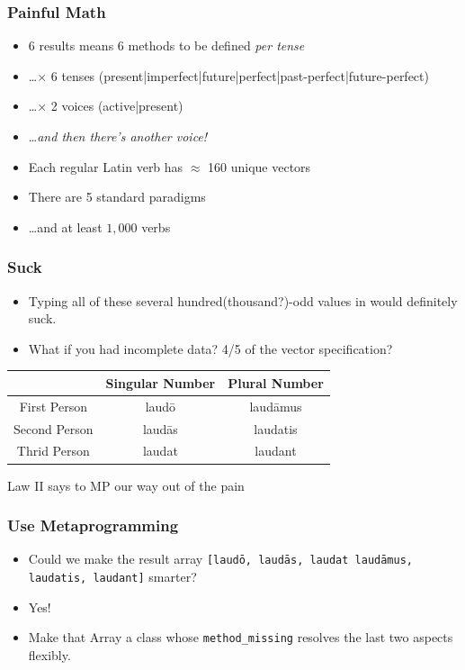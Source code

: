 \documentclass[slidestop,compress,mathserif]{beamer}
\begin{document}


\begin{frame}
	\frametitle{Painful Math}
	\begin{itemize}
		\item 6 results means 6 methods to be defined \emph{per tense}
		\pause
		\item \ldots $\times$ 6 tenses (present|imperfect|future|perfect|past-perfect|future-perfect)
		\pause
		\item \ldots $\times$ 2 voices (active|present)
		\pause
		\item \ldots \emph{and then there's another voice!}
		\pause
		\item Each regular Latin verb has $\approx$  160 unique vectors
		\pause
		\item There are 5 standard paradigms
		\pause
		\item \ldots and at least $1,000$ verbs
	\end{itemize}
\end{frame}

\begin{frame}
		\frametitle{Suck}
		\begin{itemize}
			\item Typing all of these several hundred(thousand?)-odd values in would definitely suck.
			\pause
			\item What if you had incomplete data?  4/5 of the vector specification?
		\end{itemize}
		\begin{center}
			\begin{tabular}{|c|c|c|}
				\hline
				  & Singular Number &  Plural Number\\
				\hline
				First Person  & laud\={o}  & laud\={a}mus\\
				Second Person & laud\={a}s & laudatis \\
				Thrid Person  & laudat     & laudant \\
				\hline
			\end{tabular}
		\end{center}
		\pause
		Law II says to MP our way out of the pain
\end{frame}


\begin{frame}
	\frametitle{ Use Metaprogramming}
	\begin{itemize}
		\item Could we make the result array \texttt{[laud\={o}, laud\={a}s, laudat laud\={a}mus, laudatis, laudant]} smarter?
		\pause
		\item Yes!
		\pause 
		\item Make that Array a class whose \texttt{method\_missing} resolves the last two aspects flexibly.
	\end{itemize}
\end{frame}
\end{document}
